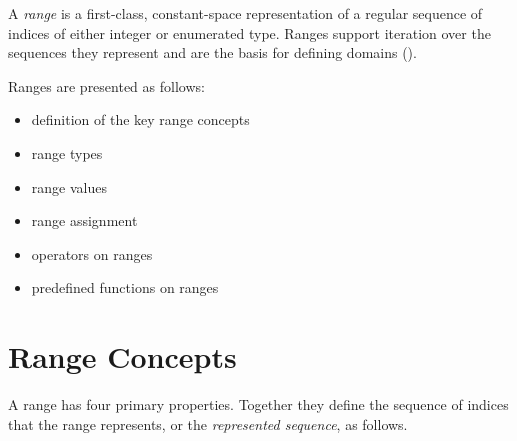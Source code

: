\label{Ranges}

A \emph{range} is a first-class, constant-space representation of a
regular sequence of indices of either integer or enumerated type.
Ranges support iteration over the sequences they represent
and are the basis for defining domains ().

Ranges are presented as follows:
\begin{itemize}
\item definition of the key range concepts 
\item range types 
\item range values 
\item range assignment 
\item operators on ranges 
\item predefined functions on ranges 
\end{itemize}


\section{Range Concepts}
\label{Range_Concepts}

A range has four primary properties. Together they define the sequence
of indices that the range represents, or the \emph{represented sequence},
as follows.

